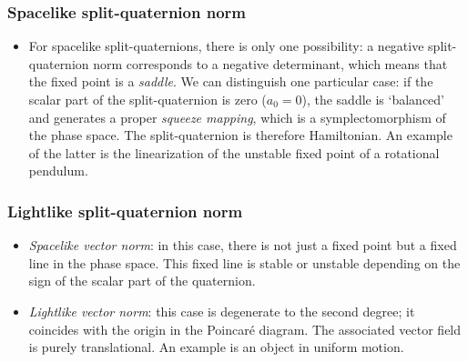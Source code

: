 \subsubsection*{Spacelike split-quaternion norm}
    \begin{itemize}
        \item[\circled{1}] For spacelike split-quaternions, there is only one possibility: a negative split-quaternion norm corresponds to a negative determinant, which means that the fixed point is a \emph{saddle}. We can distinguish one particular case: if the scalar part of the split-quaternion is zero (\(a_0 = 0\)), the saddle is `balanced' and generates a proper \emph{squeeze mapping}, which is a symplectomorphism of the phase space. The split-quaternion is therefore Hamiltonian. An example of the latter is the linearization of the unstable fixed point of a rotational pendulum.
    \end{itemize}

\subsubsection*{Lightlike split-quaternion norm}
    \begin{itemize}
        \item[\circled{2}] \emph{Spacelike vector norm}: in this case, there is not just a fixed point but a fixed line in the phase space. This fixed line is stable or unstable depending on the sign of the scalar part of the quaternion. 
        \item[\circled{3}] \emph{Lightlike vector norm}: this case is degenerate to the second degree; it coincides with the origin in the Poincaré diagram. The associated vector field is purely translational. An example is an object in uniform motion.
    \end{itemize}
